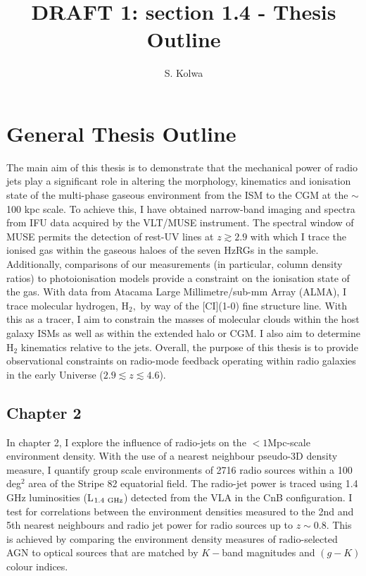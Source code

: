 \documentclass[10pt,a4paper,draft]{article}
\begin{document}
\title{{\bf DRAFT 1:} section 1.4 - Thesis Outline}
\author{S. Kolwa}
\maketitle

\section{General Thesis Outline}

The main aim of this thesis is to demonstrate that the mechanical power of radio jets play a significant role in altering the morphology, kinematics and ionisation state of the multi-phase gaseous environment from the ISM to the CGM at the $\sim$100 kpc scale. To achieve this, I have obtained narrow-band imaging and spectra from IFU data acquired by the VLT/MUSE instrument. The spectral window of MUSE permits the detection of rest-UV lines at $z \gtrsim 2.9$ with which I trace the ionised gas within the gaseous haloes of the seven HzRGs in the sample. Additionally, comparisons of our measurements (in particular, column density ratios) to photoionisation models provide a constraint on the ionisation state of the gas. With data from Atacama Large Millimetre/sub-mm Array (ALMA), I trace molecular hydrogen, H$_2,$ by way of the [CI](1-0) fine structure line. With this as a tracer, I aim to constrain the masses of molecular clouds within the host galaxy ISMs as well as within the extended halo or CGM. I also aim to determine H$_2$ kinematics relative to the jets. Overall, the purpose of this thesis is to provide observational constraints on radio-mode feedback operating within radio galaxies in the early Universe ($2.9 \lesssim z \lesssim 4.6$). 

\subsection{Chapter 2}
In chapter 2, I explore the influence of radio-jets on the $<1$Mpc-scale environment density. With the use of a nearest neighbour pseudo-3D density measure, I quantify group scale environments of 2716 radio sources within a 100 deg$^2$ area of the Stripe 82 equatorial field. The radio-jet power is traced using 1.4 GHz luminosities (L$_{1.4~\rm GHz}$) detected from the VLA in the CnB configuration. I test for correlations between the environment densities measured to the 2nd and 5th nearest neighbours and radio jet power for radio sources up to $z \sim 0.8.$ This is achieved by comparing the environment density measures of radio-selected AGN to optical sources that are matched by $K-$band magnitudes and $(g-K)$ colour indices. 
\end{document}
